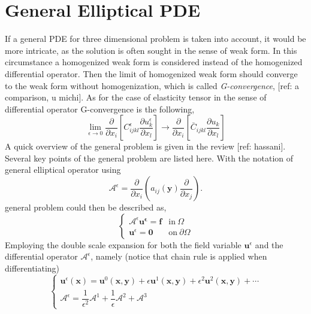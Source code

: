 \section{General Elliptical PDE}
If a general PDE for three dimensional problem is taken into account, it would be more intricate, as the solution is often sought in the sense of weak form. In this circumstance a homogenized weak form is considered instead of the homogenized differential operator. Then the limit of homogenized weak form should converge to the weak form without homogenization, which is called \textit{G-convergence}, [ref: a comparison, u michi]. As for the case of elasticity tensor in the sense of differential operator G-convergence is the following,
\begin{equation}
\label{eq: G conv}
\lim_{\epsilon \to 0} \dfrac{\partial}{\partial x_{i}} \left[ C^{\epsilon}_{ijkl} \dfrac{\partial u^{\epsilon}_{k}}{\partial x_{l}} \right] \rightarrow \dfrac{\partial}{\partial x_{i}} \left[ \bar{C}_{ijkl} \dfrac{\partial u_{k}}{\partial x_{l}} \right]
\end{equation}
A quick overview of the general problem is given in the review [ref: hassani]. Several key points of the general problem are listed here. With the notation of general elliptical operator using 
\begin{equation}
\mathcal{A}^{\epsilon} = \dfrac{\partial}{\partial x_{i}} \left( a_{ij}(\mathbf{y}) \dfrac{\partial}{\partial x_{j}} \right).
\end{equation}
general problem could then be described as,
\begin{equation}
\left\{
\begin{array}{ll}
\mathcal{A}^{\epsilon} \mathbf{u^{\epsilon}}= \mathbf{f} & \text{in} \ \Omega \\
\mathbf{u}^{\epsilon} = \mathbf{0} & \text{on} \ \partial \Omega
\end{array}
\right.
\end{equation}
Employing the double scale expansion for both the field variable $\mathbf{u}^{\epsilon}$ and the differential operator $\mathcal{A}^{\epsilon}$, namely (notice that chain rule is applied when differentiating)
\begin{equation}
\left\{
\begin{array}{l}
\mathbf{u}^{\epsilon}(\mathbf{x}) = \mathbf{u}^{0}(\mathbf{x},\mathbf{y}) + \epsilon \mathbf{u}^{1}(\mathbf{x},\mathbf{y}) + \epsilon^{2} \mathbf{u}^{2}(\mathbf{x},\mathbf{y}) + \cdots \\
\mathcal{A}^{\epsilon} = \dfrac{1}{\epsilon^{2}} \mathcal{A}^{1} + \dfrac{1}{\epsilon} \mathcal{A}^{2} + \mathcal{A}^{3}
\end{array}
\right.
\end{equation}
